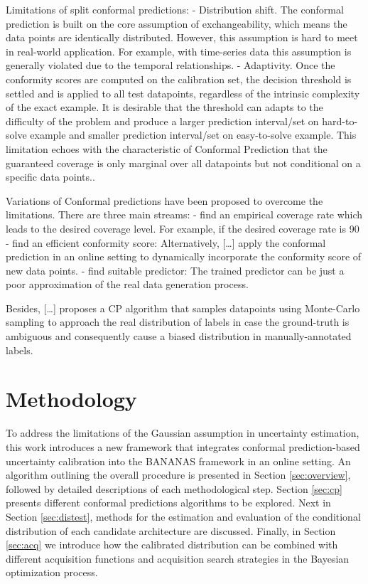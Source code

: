 \documentclass[a4paper,oneside,bibliography=totoc]{scrbook}
\begin{document}
Limitations of split conformal predictions:
- Distribution shift. The conformal prediction is built on the core assumption of exchangeability, which means the data points are identically distributed. However, this assumption is hard to meet in real-world application. For example, with time-series data this assumption is generally violated due to the temporal relationships. 
- Adaptivity. Once the conformity scores are computed on the calibration set, the decision threshold is settled and is applied to all test datapoints, regardless of the intrinsic complexity of the exact example. It is desirable that the threshold can adapts to the difficulty of the problem and produce a larger prediction interval/set on hard-to-solve example and smaller prediction interval/set on easy-to-solve example. This limitation echoes with the characteristic of Conformal Prediction that the guaranteed coverage is only marginal over all datapoints but not conditional on a specific data points..

Variations of Conformal predictions have been proposed to overcome the limitations. There are three main streams:
- find an empirical coverage rate which leads to the desired coverage level. For example, if the desired coverage rate is 90%
- find an efficient conformity score: Alternatively, […] apply the conformal prediction in an online setting to dynamically incorporate the conformity score of new data points.
- find suitable predictor: The trained predictor can be just a poor approximation of the real data generation process.

Besides, […] proposes a CP algorithm that samples datapoints using Monte-Carlo sampling to approach the real distribution of labels in case the ground-truth is ambiguous and consequently cause a biased distribution in manually-annotated labels.



\chapter{Methodology}
To address the limitations of the Gaussian assumption in uncertainty estimation, this work introduces a new framework that integrates conformal prediction-based uncertainty calibration into the BANANAS framework in an online setting. An algorithm outlining the overall procedure is presented in Section \ref{sec:overview}, followed by detailed descriptions of each methodological step. Section \ref{sec:cp} presents different conformal predictions algorithms to be explored. Next in Section \ref{sec:distest}, methods for the estimation and evaluation of the conditional distribution of each candidate architecture are discussed. Finally, in Section \ref{sec:acq} we introduce how the calibrated distribution can be combined with different acquisition functions and acquisition search strategies in the Bayesian optimization process.
\end{document}
